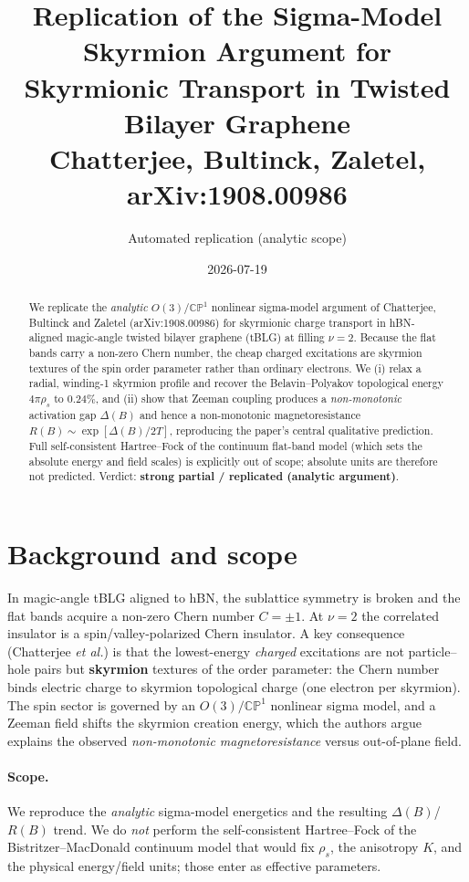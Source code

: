 \documentclass[11pt]{article}
\title{Replication of the Sigma-Model Skyrmion Argument for\\
Skyrmionic Transport in Twisted Bilayer Graphene\\
\large Chatterjee, Bultinck, Zaletel, arXiv:1908.00986}
\author{Automated replication (analytic scope)}
\date{2026-07-19}
\begin{document}
\maketitle

\begin{abstract}
We replicate the \emph{analytic} $O(3)/\mathbb{CP}^1$ nonlinear sigma-model
argument of Chatterjee, Bultinck and Zaletel (arXiv:1908.00986) for
skyrmionic charge transport in hBN-aligned magic-angle twisted bilayer
graphene (tBLG) at filling $\nu=2$. Because the flat bands carry a non-zero
Chern number, the cheap charged excitations are skyrmion textures of the spin
order parameter rather than ordinary electrons. We (i) relax a radial,
winding-1 skyrmion profile and recover the Belavin--Polyakov topological energy
$4\pi\rho_s$ to $0.24\%$, and (ii) show that Zeeman coupling produces a
\emph{non-monotonic} activation gap $\Delta(B)$ and hence a non-monotonic
magnetoresistance $R(B)\sim\exp[\Delta(B)/2T]$, reproducing the paper's central
qualitative prediction. Full self-consistent Hartree--Fock of the continuum
flat-band model (which sets the absolute energy and field scales) is explicitly
out of scope; absolute units are therefore not predicted. Verdict:
\textbf{strong partial / replicated (analytic argument)}.
\end{abstract}

\section{Background and scope}
In magic-angle tBLG aligned to hBN, the sublattice symmetry is broken and the
flat bands acquire a non-zero Chern number $C=\pm1$. At $\nu=2$ the correlated
insulator is a spin/valley-polarized Chern insulator. A key consequence
(Chatterjee \emph{et al.}) is that the lowest-energy \emph{charged} excitations
are not particle--hole pairs but \textbf{skyrmion} textures of the order
parameter: the Chern number binds electric charge to skyrmion topological
charge (one electron per skyrmion). The spin sector is governed by an
$O(3)/\mathbb{CP}^1$ nonlinear sigma model, and a Zeeman field shifts the
skyrmion creation energy, which the authors argue explains the observed
\emph{non-monotonic magnetoresistance} versus out-of-plane field.

\paragraph{Scope.} We reproduce the \emph{analytic} sigma-model energetics and
the resulting $\Delta(B)$/$R(B)$ trend. We do \emph{not} perform the
self-consistent Hartree--Fock of the Bistritzer--MacDonald continuum model that
would fix $\rho_s$, the anisotropy $K$, and the physical energy/field units;
those enter as effective parameters.
\end{document}
